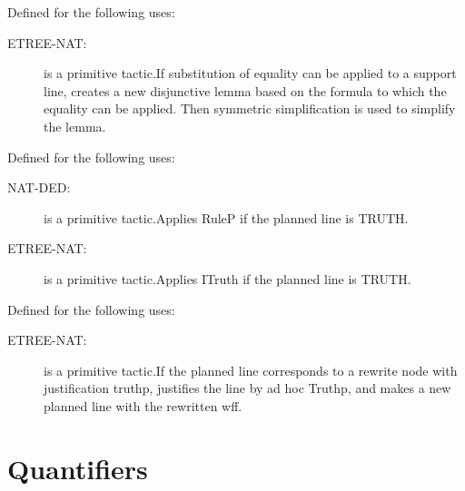 \begin{description}
\begin{description}
\end{description}

\item[SUBST=-BACKCHAIN-LEMMA-TAC]  Defined for the following uses:
\begin{description}
\item[ETREE-NAT:]  is a primitive tactic.If substitution of equality can be applied to a support line, creates
a new disjunctive lemma based on the formula to which the equality can
be applied.  Then symmetric simplification is used to simplify the lemma.

\end{description}

\item[TRUTH-TAC]  Defined for the following uses:
\begin{description}
\item[NAT-DED:]  is a primitive tactic.Applies RuleP if the planned line is TRUTH.

\item[ETREE-NAT:]  is a primitive tactic.Applies ITruth if the planned line is TRUTH.

\end{description}

\item[TRUTHP-REWRITE-PLAN-TAC]  Defined for the following uses:
\begin{description}
\item[ETREE-NAT:]  is a primitive tactic.If the planned line corresponds to a rewrite node with justification
truthp, justifies the line by ad hoc Truthp,
and makes a new planned line with the rewritten wff.

\end{description}

\item
\end{description}

\section{Quantifiers}

